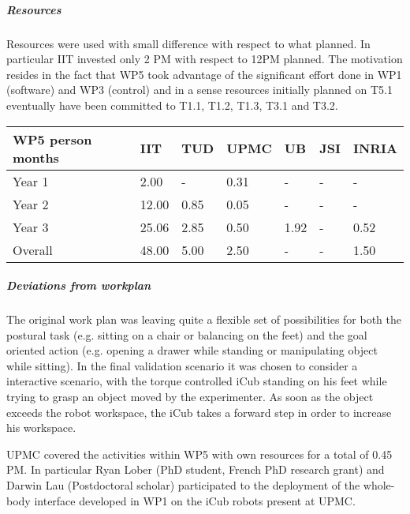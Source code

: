 
\subparagraph*{Resources}

Resources were used with small difference with respect to what planned. In particular IIT invested only 2 PM with respect to 12PM planned. The motivation resides in the fact that WP5 took advantage of the significant effort done in WP1 (software) and WP3 (control) and in a sense resources initially planned on T5.1 eventually have been committed to T1.1, T1.2, T1.3, T3.1 and T3.2.

\begin{center}
\begin{tabular}{|C{1.5cm}|C{1.5cm}|C{1.5cm}|C{2cm}|C{2cm}|C{2cm}|C{2cm}|}
\hline
\footnotesize \textbf{WP5 person months}& \footnotesize \textbf{IIT}&\footnotesize \textbf{TUD}&\footnotesize \textbf{UPMC}& \footnotesize \textbf{UB} &\footnotesize \textbf{JSI} & \footnotesize \textbf{INRIA} \\ \hline
\footnotesize Year 1 &  2.00  & - & 0.31 & - & - & -     \\  \hline
\footnotesize Year 2 &  12.00  & 0.85 & 0.05 & - & - & -     \\  \hline
\footnotesize Year 3 &  25.06 & 2.85 & 0.50 & 1.92 & - & 0.52 \\
\hline \hline
\footnotesize Overall &  48.00 & 5.00 & 2.50 & - & - & 1.50 \\ \hline
\end{tabular}
\end{center}

\subparagraph*{Deviations from workplan} 
The original work plan was leaving quite a flexible set of possibilities for both the postural task (e.g. sitting on a chair or balancing on the feet) and the goal oriented action (e.g. opening a drawer while standing or manipulating object while sitting). In the final validation scenario it was chosen to consider a interactive scenario, with the torque controlled iCub standing on his feet while trying to grasp an object moved by the experimenter. As soon as the object exceeds the robot workspace, the iCub takes a forward step in order to increase his workspace. 

UPMC covered the activities within WP5 with own resources for a total of 0.45 PM. In particular Ryan Lober (PhD student, French PhD research grant) and Darwin Lau (Postdoctoral scholar) participated to the deployment of the whole-body interface developed in WP1 on the iCub robots present at UPMC.
